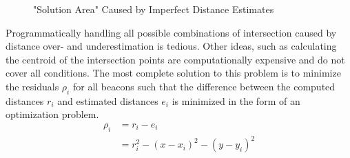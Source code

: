 \documentclass[a4paper, oneside]{ipsreport}
\begin{document}
\begin{figure}[h]
	\def\firstcircle{(0,0) circle (2.5cm)}
	\def\secondcircle{(3,-1) circle (2.2cm)}
	\def\thirdcircle{(3, 1.5) circle (2.75cm)}

	\centering
	\caption{"Solution Area" Caused by Imperfect Distance Estimates}
	\label{fig:trilaterationarea}
\end{figure}
Programmatically handling all possible combinations of intersection caused by distance over- and underestimation is tedious. Other ideas, such as calculating the centroid of the intersection points are computationally expensive and do not cover all conditions. The most complete solution to this problem is to minimize the residuals $\rho_i$ for all beacons such that the difference between the computed distances $r_i$ and estimated distances $e_i$ is minimized \autocite{localizationMIT} in the form of an optimization problem.
\begin{equation}
	\label{eq:residual}
	\begin{split}
		\rho_i & =  r_i - e_i \\
			& = r_i^2 - (x - x_i)^2 - (y - y_i)^2
	\end{split}
\end{equation}
\end{document}
